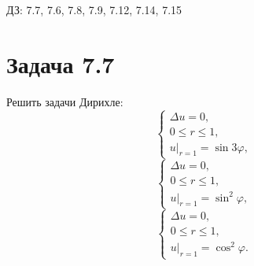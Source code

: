 \documentclass[11pt]{article}
\author{Sergey Makarov}
\date{\today}
\title{}
\def\zall{\setcounter{lem}{0}\setcounter{cnsqnc}{0}\setcounter{th}{0}\setcounter{Cmt}{0}\setcounter{equation}{0}}
\newcounter{lem}\setcounter{lem}{0}
\newcounter{th}\setcounter{th}{0}
\newcounter{cnsqnc}\setcounter{cnsqnc}{0}
\newcounter{Cmt}\setcounter{Cmt}{0}
\begin{document}
\zall

ДЗ: 7.7, 7.6, 7.8, 7.9, 7.12, 7.14, 7.15
\section{Задача 7.7}
\label{sec:org95f2848}
Решить задачи Дирихле:
\begin{equation}
\begin{cases}
\Delta u = 0, \\
0 \leq r \leq 1, \\
u|_{r = 1} = \sin 3\varphi,
\end{cases}
\end{equation}
\begin{equation}
\begin{cases}
\Delta u = 0, \\
0 \leq r \leq 1, \\
u|_{r = 1} = \sin^2\varphi,
\end{cases}
\end{equation}
\begin{equation}
\begin{cases}
\Delta u = 0, \\
0 \leq r \leq 1, \\
u|_{r = 1} = \cos^2\varphi.
\end{cases}
\end{equation}
\end{document}
